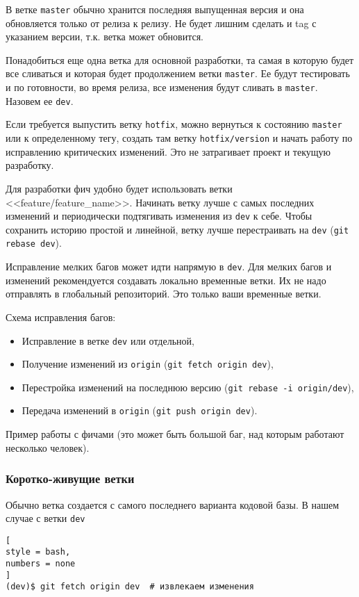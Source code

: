 \documentclass[%
	11pt,
	a4paper,
	utf8,
		]{article}
\begin{document}
В ветке \texttt{master} обычно хранится последняя выпущенная версия и она обновляется только от релиза к релизу. Не будет лишним сделать и tag с указанием версии, т.к. ветка может обновится.

Понадобиться еще одна ветка для основной разработки, та самая в которую будет все сливаться и которая будет продолжением ветки \texttt{master}. Ее будут тестировать и по готовности, во время релиза, все изменения будут сливать в \texttt{master}. Назовем ее \texttt{dev}.

Если требуется выпустить ветку \texttt{hotfix}, можно вернуться к состоянию \texttt{master} или к определенному тегу, создать там ветку \texttt{hotfix/version} и начать работу по исправлению критических изменений. Это не затрагивает проект и текущую разработку.

Для разработки фич удобно будет использовать ветки <<feature/feature\_name>>. Начинать ветку лучше с самых последних изменений и периодически подтягивать изменения из \texttt{dev} к себе. Чтобы сохранить историю простой и линейной, ветку лучше перестраивать на \texttt{dev} (\texttt{git rebase dev}).

Исправление мелких багов может идти напрямую в \texttt{dev}. Для мелких багов и изменений рекомендуется создавать локально временные ветки. Их не надо отправлять в глобальный репозиторий. Это только ваши временные ветки.

Схема исправления багов:
\begin{itemize}
	\item Исправление в ветке \texttt{dev} или отдельной,
	
	\item Получение изменений из \texttt{origin} (\texttt{git fetch origin dev}),
	
	\item Перестройка изменений на последнюю версию (\texttt{git rebase -i origin/dev}),
	
	\item Передача изменений в \texttt{origin} (\texttt{git push origin dev}).
\end{itemize}

Пример работы с фичами (это может быть большой баг, над которым работают несколько человек).

\subsubsection{Коротко-живущие ветки}

Обычно ветка создается с самого последнего варианта кодовой базы. В нашем случае с ветки \texttt{dev}
\begin{lstlisting}[
style = bash,
numbers = none
]
(dev)$ git fetch origin dev  # извлекаем изменения
\end{lstlisting}
\end{document}

